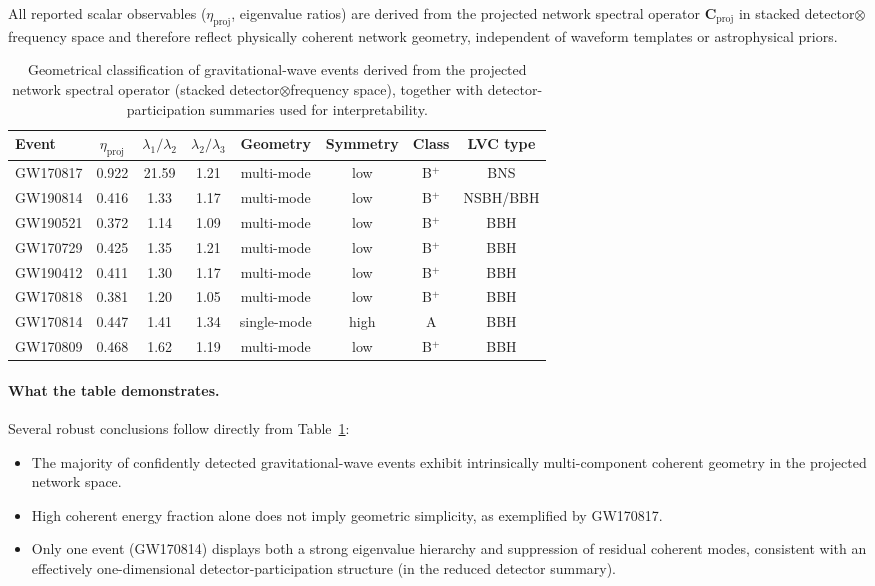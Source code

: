 \documentclass[11pt,a4paper]{article}
\begin{document}
All reported scalar observables ($\eta_{\mathrm{proj}}$, eigenvalue ratios) are derived from the
projected network spectral operator $\mathbf{C}_{\mathrm{proj}}$ in stacked detector$\otimes$frequency
space and therefore reflect physically coherent network geometry, independent of waveform
templates or astrophysical priors.

\begin{table}[t]
\centering
\caption{Geometrical classification of gravitational-wave events derived from the projected
network spectral operator (stacked detector$\otimes$frequency space), together with detector-participation
summaries used for interpretability.}
\label{tab:geometric_classification}
\vspace{0.3cm}
\begin{tabular}{lccccccc}
\toprule
Event
& $\eta_{\mathrm{proj}}$
& $\lambda_1/\lambda_2$
& $\lambda_2/\lambda_3$
& Geometry
& Symmetry
& Class
& LVC type \\
\midrule
GW170817 & 0.922 & 21.59 & 1.21 & multi-mode & low  & B$^+$ & BNS \\
GW190814 & 0.416 & 1.33  & 1.17 & multi-mode & low  & B$^+$ & NSBH/BBH \\
GW190521 & 0.372 & 1.14  & 1.09 & multi-mode & low  & B$^+$ & BBH \\
GW170729 & 0.425 & 1.35  & 1.21 & multi-mode & low  & B$^+$ & BBH \\
GW190412 & 0.411 & 1.30  & 1.17 & multi-mode & low  & B$^+$ & BBH \\
GW170818 & 0.381 & 1.20  & 1.05 & multi-mode & low  & B$^+$ & BBH \\
GW170814 & 0.447 & 1.41  & 1.34 & single-mode & high & A     & BBH \\
GW170809 & 0.468 & 1.62  & 1.19 & multi-mode & low  & B$^+$ & BBH \\
\bottomrule
\end{tabular}
\end{table}

\paragraph{What the table demonstrates.}
Several robust conclusions follow directly from
Table~\ref{tab:geometric_classification}:

\begin{itemize}
\item The majority of confidently detected gravitational-wave events exhibit
    intrinsically multi-component coherent geometry in the projected network space.
\item High coherent energy fraction alone does not imply geometric simplicity, as
      exemplified by GW170817.
\item Only one event (GW170814) displays both a strong eigenvalue hierarchy and
      suppression of residual coherent modes, consistent with an effectively
    one-dimensional detector-participation structure (in the reduced detector summary).
\end{itemize}
\end{document}

